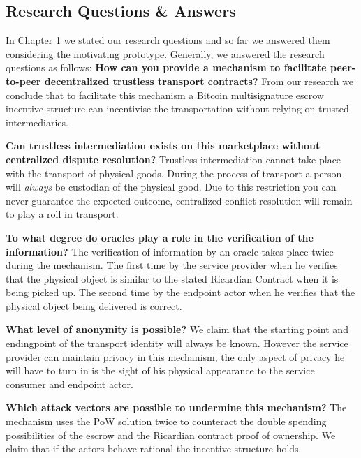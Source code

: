 \subsection{Research Questions \& Answers}

In Chapter 1 we stated our research questions and so far we answered them considering the motivating prototype. Generally, we answered the research questions as follows:
\bigbreak
\noindent \textbf{How can you provide a mechanism to facilitate peer-to-peer decentralized trustless transport contracts?} From our research we conclude that to facilitate this mechanism a Bitcoin multisignature escrow incentive structure can incentivise the transportation without relying on trusted intermediaries.

\bigbreak
\noindent \textbf{Can trustless intermediation exists on this marketplace without centralized dispute resolution?} Trustless intermediation cannot take place with the transport of physical goods. During the process of transport a person will \textit{always} be custodian of the physical good. Due to this restriction you can never guarantee the expected outcome, centralized conflict resolution will remain to play a roll in transport.


\bigbreak
\noindent \textbf{To what degree do oracles play a role in the verification of the information?} The verification of information by an oracle takes place twice during the mechanism. The first time by the service provider when he verifies that the physical object is similar to the stated Ricardian Contract when it is being picked up. The second time by the endpoint actor when he verifies that the physical object being delivered is correct.

\bigbreak
\noindent \textbf{What level of anonymity is possible?} We claim that the starting point and endingpoint of the transport identity will always be known. However the service provider can maintain privacy in this mechanism, the only aspect of privacy he will have to turn in is the sight of his physical appearance to the service consumer and endpoint actor.

\bigbreak
\noindent \textbf{Which attack vectors are possible to undermine this mechanism?} The mechanism uses the PoW solution twice to counteract the double spending possibilities of the escrow and the Ricardian contract proof of ownership. We claim that if the actors behave rational the incentive structure holds.
\newpage


